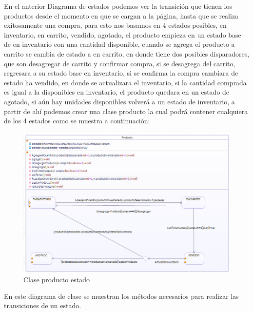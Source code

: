 En el anterior Diagrama de estados podemos ver la transición que tienen los productos desde el momento en que se cargan a la página, hasta que se realiza exitosamente una  compra, para esto nos basamos en 4 estados posibles, en inventario, en carrito, vendido, agotado, el producto empieza en un estado base de en inventario con una cantidad disponible, cuando se agrega el producto a carrito se cambia de estado a en carrito, en donde tiene dos posibles disparadores, que son desagregar de carrito y confirmar compra, si se desagrega del carrito, regresara a su estado base en inventario, si se confirma la compra cambiara de estado ha vendido, en donde se actualizara el inventario, si la cantidad comprada es igual a la disponibles en inventario, el producto quedara en un estado de agotado, si aún hay unidades disponibles volverá a un estado de inventario, a partir de ahí podemos crear una clase producto la cual podrá contener cualquiera de los 4 estados como se muestra a continuación:


\begin{figure}[th!]
	\centering
	\includegraphics[width=0.7\linewidth]{arquitectura/imagenes/clase_producto_estados}
	\caption{Clase producto estado}
\end{figure}

En este diagrama de clase se muestran los métodos necesarios para realizar las transiciones de un estado.
\newpage






